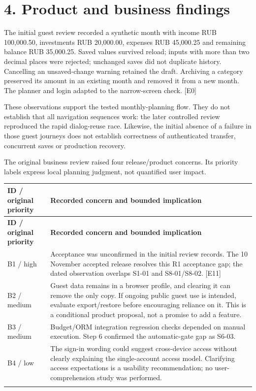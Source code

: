 \documentclass[11pt,a4paper]{article}
\begin{document}
\section*{4. Product and business findings}

The initial guest review recorded a synthetic month with income RUB 100,000.50, investments RUB 20,000.00, expenses RUB 45,000.25 and remaining balance RUB 35,000.25. Saved values survived reload; inputs with more than two decimal places were rejected; unchanged saves did not duplicate history. Cancelling an unsaved-change warning retained the draft. Archiving a category preserved its amount in an existing month and removed it from a new month. The planner and login adapted to the narrow-screen check. [E0]

These observations support the tested monthly-planning flow. They do not establish that all navigation sequences work: the later controlled review reproduced the rapid dialog-reuse race. Likewise, the initial absence of a failure in those guest journeys does not establish correctness of authenticated transfer, concurrent saves or production recovery.

The original business review raised four release/\allowbreak{}product concerns. Its priority labels express local planning judgment, not quantified user impact.

{\fontsize{9.5}{11.5}\selectfont
\begin{longtable}{@{}>{\raggedright\arraybackslash}p{}>{\raggedright\arraybackslash}p{}@{}}\toprule
\textbf{ID /\allowbreak{} original priority} & \textbf{Recorded concern and bounded implication} \\ \midrule\endfirsthead
\toprule\textbf{ID /\allowbreak{} original priority} & \textbf{Recorded concern and bounded implication} \\ \midrule\endhead
\bottomrule\endfoot
B1 /\allowbreak{} high & Acceptance was unconfirmed in the initial review records. The 10 November accepted release resolves this R1 acceptance gap; the dated observation overlaps S1-01 and S8-01/\allowbreak{}S8-02. [E11] \\ \addlinespace[3pt]
B2 /\allowbreak{} medium & Guest data remains in a browser profile, and clearing it can remove the only copy. If ongoing public guest use is intended, evaluate export/\allowbreak{}restore before encouraging reliance on it. This is a conditional product proposal, not a promise to add a feature. \\ \addlinespace[3pt]
B3 /\allowbreak{} medium & Budget/\allowbreak{}ORM integration regression checks depended on manual execution. Step 6 confirmed the automatic-gate gap as S6-03. \\ \addlinespace[3pt]
B4 /\allowbreak{} low & The sign-in wording could suggest cross-device access without clearly explaining the single-account access model. Clarifying access expectations is a usability recommendation; no user-comprehension study was performed. \\ \addlinespace[3pt]
\end{longtable}}
\end{document}
